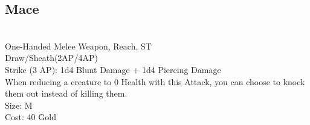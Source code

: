 \subsection{Mace}\label{weapon:mace}\\
One-Handed Melee Weapon,  Reach, ST\\
Draw/Sheath(2AP/4AP)\\
Strike (3 AP): 1d4 Blunt Damage + 1d4 Piercing Damage\\
When reducing a creature to 0 Health with this Attack, you can choose to knock them out instead of killing them.\\
Size: M\\
Cost: 40 Gold\\